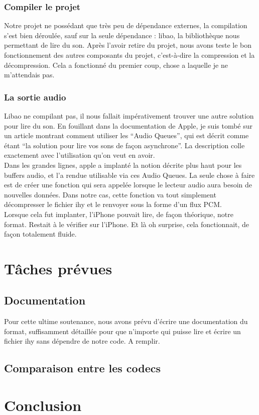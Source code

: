 \documentclass[a4paper,12pt]{article}
\begin{document}
		\subsubsection{Compiler le projet}
Notre projet ne possédant que très peu de dépendance externes, la
compilation s'est bien déroulée, sauf sur la seule dépendance : libao, la
bibliothèque nous permettant de lire du son. Après l'avoir retire du
projet, nous avons teste le bon fonctionnement des autres composants du
projet, c'est-à-dire la compression et la décompression. Cela a
fonctionné du premier coup, chose a laquelle je ne m'attendais pas.\\
		\subsubsection{La sortie audio}
Libao ne compilant pas, il nous fallait impérativement trouver une autre
solution pour lire du son. En fouillant dans la documentation de Apple, je suis
tombé sur un article montrant comment utiliser les ``Audio Queues'', qui est
décrit comme étant ``la solution pour lire vos sons de façon asynchrone''. La
description colle exactement avec l'utilisation qu'on veut en avoir.\\
Dans les grandes lignes, apple a implanté la notion décrite plus haut pour
les buffers audio, et l'a rendue utilisable via ces Audio Queues. La seule chose
à faire est de créer une fonction qui sera appelée lorsque le lecteur audio aura
besoin de nouvelles données. Dans notre cas, cette fonction va tout simplement
décompresser le fichier ihy et le renvoyer sous la forme d'un flux PCM.\\
Lorsque cela fut implanter, l'iPhone pouvait lire, de façon théorique, notre
format. Restait à le vérifier sur l'iPhone. Et là oh surprise, cela
fonctionnait, de façon totalement fluide. 

\newpage

\section{Tâches prévues}
	\subsection{Documentation}
Pour cette ultime soutenance, nous avons prévu d'écrire une documentation du
format, suffisamment détaillée pour que n'importe qui puisse lire et écrire un
fichier ihy sans dépendre de notre code. A remplir.
	\subsection{Comparaison entre les codecs}

\newpage

\section*{Conclusion}
\end{document}
